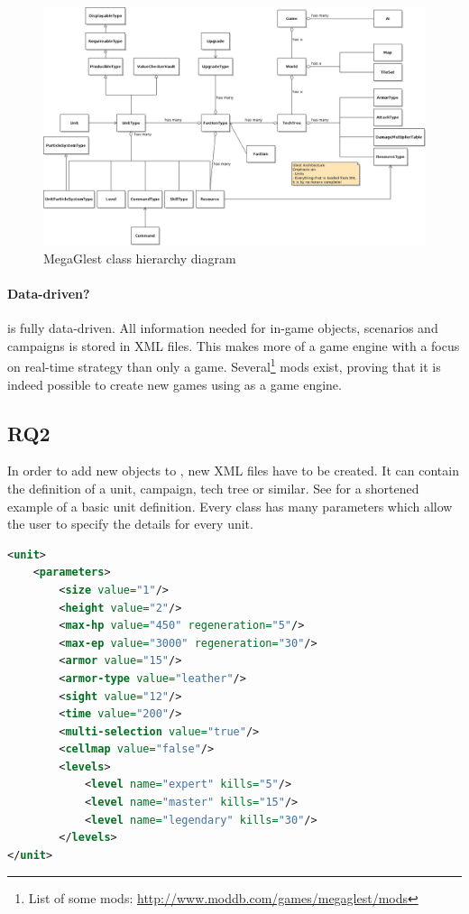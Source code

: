 \begin{figure}[h!]
    \centering
    \includegraphics[angle=90,width=\textwidth]{pics/gamehierarchy}
    \caption{MegaGlest class hierarchy diagram}
    \label{fig:glestclassh}
\end{figure}

\paragraph{Data-driven?}
\GLEST{} is fully data-driven. All information needed for in-game objects, scenarios and campaigns is stored in XML files.
This makes \GLEST{} more of a game engine with a focus on real-time strategy than only a game. Several\footnote{List of
some mods: \url{http://www.moddb.com/games/megaglest/mods}} mods exist, proving that it is indeed possible to create new
games using \GLEST{} as a game engine. 

\subsection{RQ2}
In order to add new objects to \GLEST{}, new XML files have to be created. It can contain the definition of a unit, campaign,
tech tree or similar. See  for a shortened example of a basic unit definition. Every class has many
parameters which allow the user to specify the details for every unit. 

\begin{lstlisting}[language=XML,caption=A basic \GLEST{} (shortened) unit definition in XML, label=glestxml]
<unit>
	<parameters>
		<size value="1"/>
		<height value="2"/>
		<max-hp value="450" regeneration="5"/>
		<max-ep value="3000" regeneration="30"/>
		<armor value="15"/>	
		<armor-type value="leather"/>
		<sight value="12"/>
		<time value="200"/>	
		<multi-selection value="true"/>	
		<cellmap value="false"/>
		<levels>
			<level name="expert" kills="5"/>
			<level name="master" kills="15"/>
			<level name="legendary" kills="30"/>
		</levels>
</unit>
\end{lstlisting}

